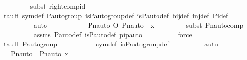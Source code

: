 \begin{isabellebody}
\ \ \ \ \ \ \ \ \isamarkupfalse%
{\isacharparenleft}{\kern0pt}subst\ right{\isacharunderscore}{\kern0pt}comp{\isacharunderscore}{\kern0pt}id{\isacharparenright}{\kern0pt}\isanewline
\ \ \ \ \ \ \ \ \isamarkupfalse%
\ tauH\ sym{\isacharunderscore}{\kern0pt}def\ {\isasymG}{\isacharunderscore}{\kern0pt}P{\isacharunderscore}{\kern0pt}auto{\isacharunderscore}{\kern0pt}group\ is{\isacharunderscore}{\kern0pt}P{\isacharunderscore}{\kern0pt}auto{\isacharunderscore}{\kern0pt}group{\isacharunderscore}{\kern0pt}def\ is{\isacharunderscore}{\kern0pt}P{\isacharunderscore}{\kern0pt}auto{\isacharunderscore}{\kern0pt}def\ bij{\isacharunderscore}{\kern0pt}def\ inj{\isacharunderscore}{\kern0pt}def\ Pi{\isacharunderscore}{\kern0pt}def\ \isanewline
\ \ \ \ \ \ \ \ \isamarkupfalse%
\ auto\isanewline
\ \ \ \ \ \ \isamarkupfalse%
\ \isamarkupfalse%
\ {\isachardoublequoteopen}{\isachardot}{\kern0pt}{\isachardot}{\kern0pt}{\isachardot}{\kern0pt}\ {\isacharequal}{\kern0pt}\ {\isacharparenleft}{\kern0pt}Pn{\isacharunderscore}{\kern0pt}auto{\isacharparenleft}{\kern0pt}{\isasympi}{\isacharparenright}{\kern0pt}\ O\ Pn{\isacharunderscore}{\kern0pt}auto{\isacharparenleft}{\kern0pt}{\isasymtau}{\isacharparenright}{\kern0pt}{\isacharparenright}{\kern0pt}\ {\isacharbackquote}{\kern0pt}\ x{\isachardoublequoteclose}\isanewline
\ \ \ \ \ \ \ \ \isamarkupfalse%
{\isacharparenleft}{\kern0pt}subst\ Pn{\isacharunderscore}{\kern0pt}auto{\isacharunderscore}{\kern0pt}comp{\isacharparenright}{\kern0pt}\isanewline
\ \ \ \ \ \ \ \ \isamarkupfalse%
\ assms\ P{\isacharunderscore}{\kern0pt}auto{\isacharunderscore}{\kern0pt}def\ is{\isacharunderscore}{\kern0pt}P{\isacharunderscore}{\kern0pt}auto{\isacharunderscore}{\kern0pt}def\ pi{\isacharunderscore}{\kern0pt}pauto\isanewline
\ \ \ \ \ \ \ \ \isamarkupfalse%
\ force\isanewline
\ \ \ \ \ \ \ \ \isamarkupfalse%
\ tauH\ {\isasymG}{\isacharunderscore}{\kern0pt}P{\isacharunderscore}{\kern0pt}auto{\isacharunderscore}{\kern0pt}group\ \isanewline
\ \ \ \ \ \ \ \ \isamarkupfalse%
\ sym{\isacharunderscore}{\kern0pt}def\ is{\isacharunderscore}{\kern0pt}P{\isacharunderscore}{\kern0pt}auto{\isacharunderscore}{\kern0pt}group{\isacharunderscore}{\kern0pt}def\isanewline
\ \ \ \ \ \ \ \ \isamarkupfalse%
\ auto\isanewline
\ \ \ \ \ \ \isamarkupfalse%
\ \isamarkupfalse%
\ {\isachardoublequoteopen}{\isachardot}{\kern0pt}{\isachardot}{\kern0pt}{\isachardot}{\kern0pt}\ {\isacharequal}{\kern0pt}\ Pn{\isacharunderscore}{\kern0pt}auto{\isacharparenleft}{\kern0pt}{\isasympi}{\isacharparenright}{\kern0pt}\ {\isacharbackquote}{\kern0pt}\ {\isacharparenleft}{\kern0pt}Pn{\isacharunderscore}{\kern0pt}auto{\isacharparenleft}{\kern0pt}{\isasymtau}{\isacharparenright}{\kern0pt}{\isacharbackquote}{\kern0pt}\ x{\isacharparenright}{\kern0pt}{\isachardoublequoteclose}\isanewline

\end{isabellebody}
